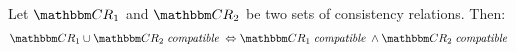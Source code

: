 \begin{theorem} \label{theorem:independencecompatibility}
    Let $\consistencyrelationset{CR}_{1}$ and $\consistencyrelationset{CR}_{2}$ be two sets of consistency relations. Then:
    \begin{align*}
        \consistencyrelationset{CR}_{1} \cup \consistencyrelationset{CR}_{2} \compatiblemath \equivalent \consistencyrelationset{CR}_{1} \compatiblemath \land \consistencyrelationset{CR}_{2} \compatiblemath
    \end{align*}
\end{theorem}
